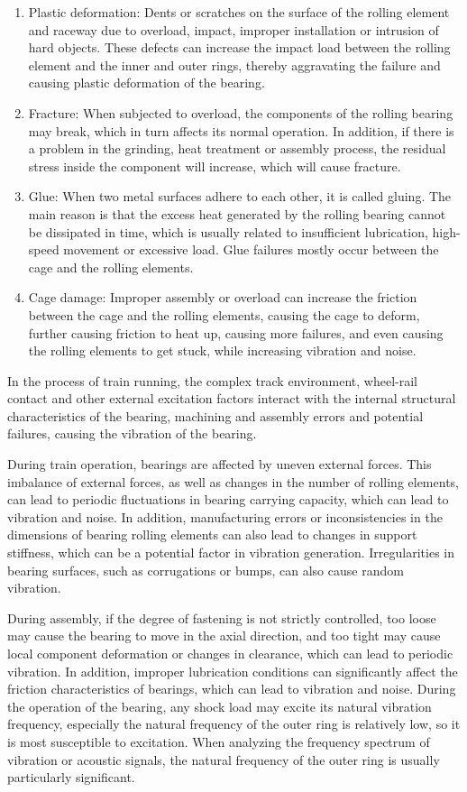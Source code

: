 \documentclass{article}
\begin{document}
\begin{enumerate}
    \item Plastic deformation: Dents or scratches on the surface of the rolling element and raceway due to overload, impact, improper installation or intrusion of hard objects. These defects can increase the impact load between the rolling element and the inner and outer rings, thereby aggravating the failure and causing plastic deformation of the bearing.
    \item Fracture: When subjected to overload, the components of the rolling bearing may break, which in turn affects its normal operation. In addition, if there is a problem in the grinding, heat treatment or assembly process, the residual stress inside the component will increase, which will cause fracture.
    \item Glue: When two metal surfaces adhere to each other, it is called gluing. The main reason is that the excess heat generated by the rolling bearing cannot be dissipated in time, which is usually related to insufficient lubrication, high-speed movement or excessive load. Glue failures mostly occur between the cage and the rolling elements.
    \item Cage damage: Improper assembly or overload can increase the friction between the cage and the rolling elements, causing the cage to deform, further causing friction to heat up, causing more failures, and even causing the rolling elements to get stuck, while increasing vibration and noise.
\end{enumerate}

In the process of train running, the complex track environment, wheel-rail contact and other external excitation factors interact with the internal structural characteristics of the bearing, machining and assembly errors and potential failures, causing the vibration of the bearing.

During train operation, bearings are affected by uneven external forces. This imbalance of external forces, as well as changes in the number of rolling elements, can lead to periodic fluctuations in bearing carrying capacity, which can lead to vibration and noise. In addition, manufacturing errors or inconsistencies in the dimensions of bearing rolling elements can also lead to changes in support stiffness, which can be a potential factor in vibration generation. Irregularities in bearing surfaces, such as corrugations or bumps, can also cause random vibration.

During assembly, if the degree of fastening is not strictly controlled, too loose may cause the bearing to move in the axial direction, and too tight may cause local component deformation or changes in clearance, which can lead to periodic vibration. In addition, improper lubrication conditions can significantly affect the friction characteristics of bearings, which can lead to vibration and noise. During the operation of the bearing, any shock load may excite its natural vibration frequency, especially the natural frequency of the outer ring is relatively low, so it is most susceptible to excitation. When analyzing the frequency spectrum of vibration or acoustic signals, the natural frequency of the outer ring is usually particularly significant. 
\end{document}
